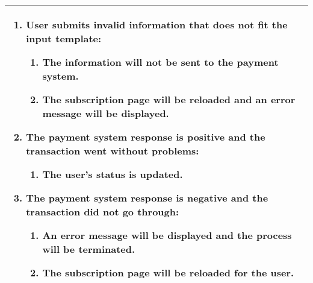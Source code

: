 \begin{tabular}{|p{16.5cm}|}
\begin{enumerate}
	\item User submits invalid information that does not fit the input template:
	\begin{enumerate}
 		\item The information will not be sent to the payment system.
		\item The subscription page will be reloaded and an error message will be displayed.
	\end{enumerate}
	\item  The payment system response is positive and the transaction went without problems:
	\begin{enumerate}
 		\item  The user's status is updated.
	\end{enumerate}
	\item  The payment system response is negative and the transaction did not go through:
	\begin{enumerate}
 		\item  An error message will be displayed and the process will be terminated.
		\item The subscription page will be reloaded for the user.
	\end{enumerate}
\end{enumerate}

\\ \hline
\end{tabular} 

